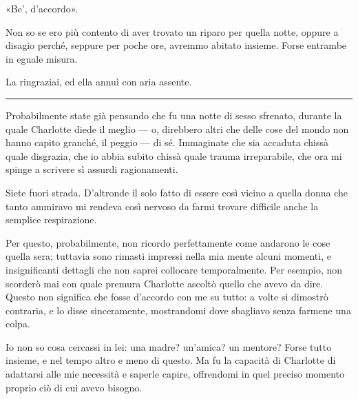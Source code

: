 \documentclass[a4paper,11pt,oneside,openright,final]{memoir}
\begin{document}
«Be', d'accordo».

Non so se ero più contento di aver trovato un riparo per quella notte, oppure
a disagio perché, seppure per poche ore, avremmo abitato insieme. Forse entrambe
in eguale misura.

La ringraziai, ed ella annuì con aria assente.

\plainbreak{1}

Probabilmente state già pensando che fu una notte di sesso sfrenato, durante la
quale Charlotte diede il meglio --- o, direbbero altri che delle cose del mondo
non hanno capito granché, il peggio --- di sé. Immaginate che sia accaduta chissà
quale disgrazia, che io abbia subito chissà quale trauma irreparabile, che ora mi
spinge a scrivere sì assurdi ragionamenti.

Siete fuori strada. D'altronde il solo fatto di essere così vicino a quella donna
che tanto ammiravo mi rendeva così nervoso da farmi trovare difficile anche la
semplice respirazione.

Per questo, probabilmente, non ricordo perfettamente come andarono le cose quella
sera; tuttavia sono rimasti impressi nella mia mente alcuni momenti, e
insignificanti dettagli che non saprei collocare temporalmente. Per esempio, non
scorderò mai con quale premura Charlotte ascoltò quello che avevo da dire. Questo
non significa che fosse d'accordo con me su tutto: a volte si dimostrò contraria,
e lo disse sinceramente, mostrandomi dove sbagliavo senza farmene una colpa.

Io non so cosa cercassi in lei: una madre? un'amica? un mentore? Forse tutto
insieme, e nel tempo altro e meno di questo. Ma fu la capacità di Charlotte di
adattarsi alle mie necessità e saperle capire, offrendomi in quel preciso momento
proprio ciò di cui avevo bisogno.

\clearpage

\tableofcontents
\end{document}
